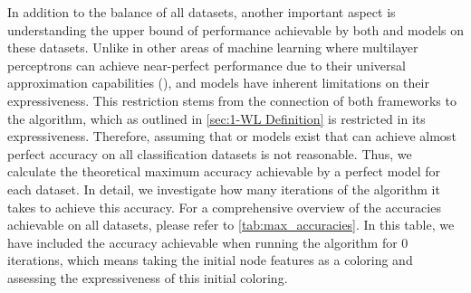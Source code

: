 In addition to the balance of all datasets, another important aspect is understanding the upper bound of performance achievable by both \gnn and \wlnn models on these datasets. Unlike in other areas of machine learning where multilayer perceptrons can achieve near-perfect performance due to their universal approximation capabilities (\cite{Hornik1991}), \gnn and \wlnn models have inherent limitations on their expressiveness. This restriction stems from the connection of both frameworks to the \wl algorithm, which as outlined in \cref{sec:1-WL Definition} is restricted in its expressiveness. Therefore, assuming that \gnn or \wlnn models exist that can achieve almost perfect accuracy on all classification datasets is not reasonable. Thus, we calculate the theoretical maximum accuracy achievable by a perfect model for each dataset. In detail, we investigate how many iterations of the \wl algorithm it takes to achieve this accuracy. For a comprehensive overview of the accuracies achievable on all datasets, please refer to \cref{tab:max_accuracies}. In this table, we have included the accuracy achievable when running the \wl algorithm for $0$ iterations, which means taking the initial node features as a coloring and assessing the expressiveness of this initial coloring.

\begin{table}[!htb]
	\caption{An overview of the maximum theoretical classification accuracy achievable for each dataset based on the number of \wl iterations in percent. A hyphen ``-'' indicates that the maximum accuracy has converged with fewer iterations, implying that further iterations do not improve the accuracy.}
	\label{tab:max_accuracies}
\end{table}

